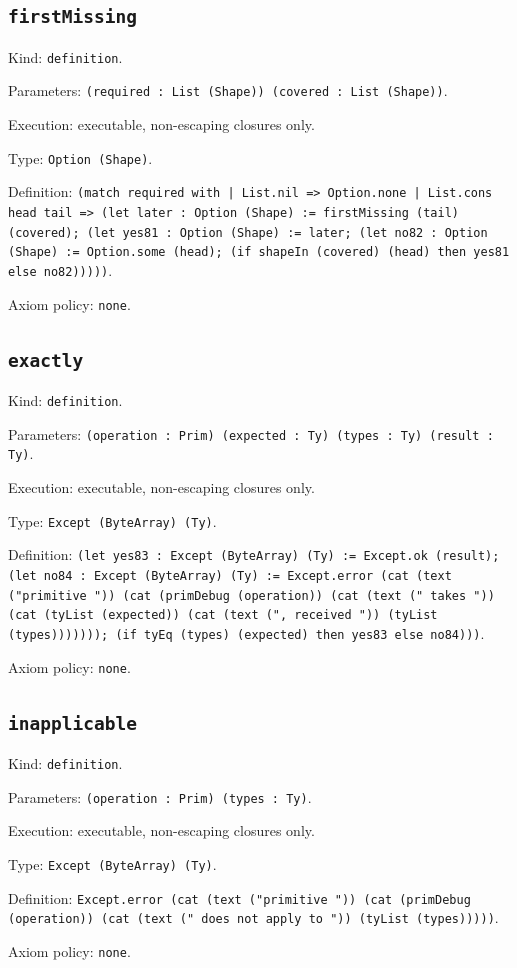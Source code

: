 \documentclass[11pt]{article}
\begin{document}
\subsection*{\texttt{firstMissing}}
\noindent Kind: \texttt{definition}.\par
\noindent Parameters: \texttt{(required : List (Shape)) (covered : List (Shape))}.\par
\noindent Execution: executable, non-escaping closures only.\par
\noindent Type: \texttt{Option (Shape)}.\par
\noindent Definition: \texttt{(match required with | List.nil => Option.none | List.cons head tail => (let later : Option (Shape) := firstMissing (tail) (covered); (let yes81 : Option (Shape) := later; (let no82 : Option (Shape) := Option.some (head); (if shapeIn (covered) (head) then yes81 else no82)))))}.\par
\noindent Axiom policy: \texttt{none}.\par
\subsection*{\texttt{exactly}}
\noindent Kind: \texttt{definition}.\par
\noindent Parameters: \texttt{(operation : Prim) (expected : Ty) (types : Ty) (result : Ty)}.\par
\noindent Execution: executable, non-escaping closures only.\par
\noindent Type: \texttt{Except (ByteArray) (Ty)}.\par
\noindent Definition: \texttt{(let yes83 : Except (ByteArray) (Ty) := Except.ok (result); (let no84 : Except (ByteArray) (Ty) := Except.error (cat (text ("primitive ")) (cat (primDebug (operation)) (cat (text (" takes ")) (cat (tyList (expected)) (cat (text (", received ")) (tyList (types))))))); (if tyEq (types) (expected) then yes83 else no84)))}.\par
\noindent Axiom policy: \texttt{none}.\par
\subsection*{\texttt{inapplicable}}
\noindent Kind: \texttt{definition}.\par
\noindent Parameters: \texttt{(operation : Prim) (types : Ty)}.\par
\noindent Execution: executable, non-escaping closures only.\par
\noindent Type: \texttt{Except (ByteArray) (Ty)}.\par
\noindent Definition: \texttt{Except.error (cat (text ("primitive ")) (cat (primDebug (operation)) (cat (text (" does not apply to ")) (tyList (types)))))}.\par
\noindent Axiom policy: \texttt{none}.\par
\end{document}
